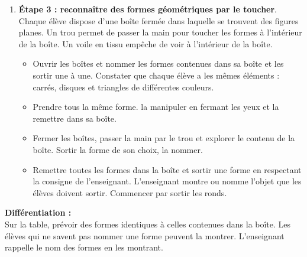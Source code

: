 \begin{exercice*}
\begin{enumerate}
\item {\bf Étape 3 : reconnaître des formes géométriques par le toucher}. \\
Chaque élève dispose d'une boîte fermée dans laquelle se trouvent des figures planes. Un trou permet de passer la main pour toucher les formes à l'intérieur de la boîte. Un voile en tissu empêche de voir à l'intérieur de la boîte.
\begin{itemize}
   \item Ouvrir les boîtes et nommer les formes contenues dans sa boîte et les sortir une à une. Constater que chaque élève a les mêmes éléments : carrés, disques et triangles de différentes couleurs.
   \item Prendre tous la même forme. la manipuler en fermant les yeux et la remettre dans sa boîte.
   \item Fermer les boîtes, passer la main par le trou et explorer le contenu de la boîte. Sortir la forme de son choix, la nommer.
   \item Remettre toutes les formes dans la boîte et sortir une forme en respectant la consigne de l'enseignant. L'enseignant montre ou nomme l'objet que les élèves doivent sortir. Commencer par sortir les ronds. \\ [-2mm]
\end{itemize}
\end{enumerate}

{\bf Différentiation :} \\
Sur la table, prévoir des formes identiques à celles contenues dans la boîte. Les élèves qui ne savent pas nommer une forme peuvent la montrer. L'enseignant rappelle le nom des formes en les montrant.
\end{exercice*}


